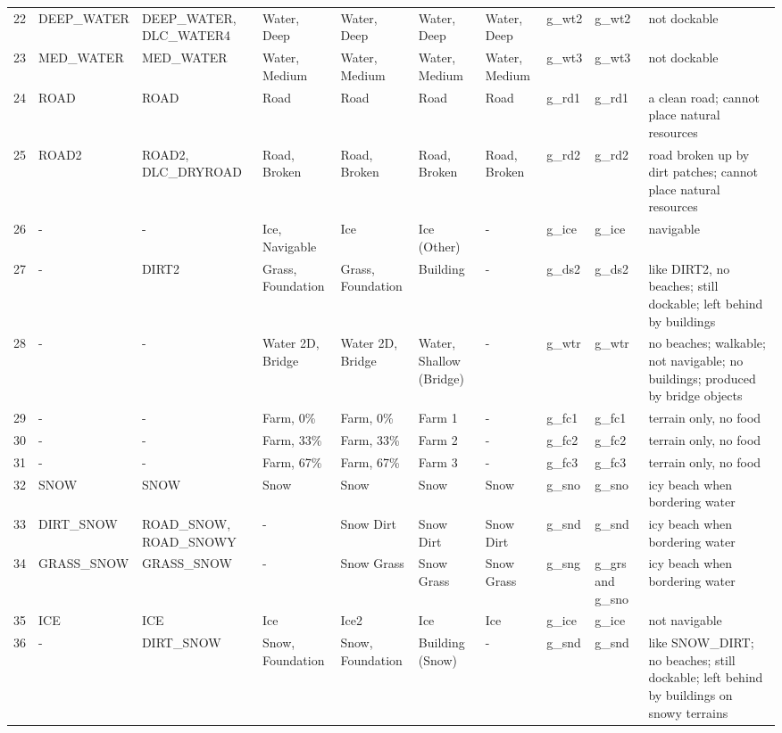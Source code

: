 \begin{landscape}
\begin{longtable}{@{}p{5mm}|p{25mm}p{23mm}|p{14mm}p{14mm}p{14mm}p{14mm}|p{10mm}p{15mm}|p{45mm}@{}}
            22	& DEEP\_WATER	& DEEP\_WATER, DLC\_WATER4	& Water, Deep	& Water, Deep	& Water, Deep	& Water, Deep	& g\_wt2	& g\_wt2		& not dockable \\
            23	& MED\_WATER	& MED\_WATER	& Water, Medium	& Water, Medium	& Water, Medium	& Water, Medium	& g\_wt3	& g\_wt3		& not dockable \\
            24	& ROAD	& ROAD	& Road	& Road	& Road	& Road	& g\_rd1	& g\_rd1		& a clean road; cannot place natural resources \\
            25	& ROAD2	& ROAD2, DLC\_DRYROAD	& Road, Broken	& Road, Broken	& Road, Broken	& Road, Broken	& g\_rd2	& g\_rd2		& road broken up by dirt patches; cannot place natural resources \\
            26	& -	& -	& Ice, Navigable	& Ice	& Ice (Other)	& -	& g\_ice	& g\_ice		& navigable \\
            27	& -	& DIRT2	& Grass, Foundation	& Grass, Foundation	& Building	& -	& g\_ds2	& g\_ds2		& like DIRT2, no beaches; still dockable; left behind by buildings \\
            28	& -	& -	& Water 2D, Bridge	& Water 2D, Bridge	& Water, Shallow (Bridge)	& -	& g\_wtr	& g\_wtr		& no beaches; walkable; not navigable; no buildings; produced by bridge objects \\
            29	& -	& -	& Farm, 0\%	& Farm, 0\%	& Farm 1	& -	& g\_fc1	& g\_fc1		& terrain only, no food \\
            30	& -	& -	& Farm, 33\%	& Farm, 33\%	& Farm 2	& -	& g\_fc2	& g\_fc2		& terrain only, no food \\
            31	& -	& -	& Farm, 67\%	& Farm, 67\%	& Farm 3	& -	& g\_fc3	& g\_fc3		& terrain only, no food \\
            32	& SNOW	& SNOW	& Snow	& Snow	& Snow	& Snow	& g\_sno	& g\_sno		& icy beach when bordering water \\
            33	& DIRT\_SNOW	& ROAD\_SNOW, ROAD\_SNOWY	& -	& Snow Dirt	& Snow Dirt	& Snow Dirt	& g\_snd	& g\_snd		& icy beach when bordering water \\
            34	& GRASS\_SNOW	& GRASS\_SNOW	& -	& Snow Grass	& Snow Grass	& Snow Grass	& g\_sng	& g\_grs and g\_sno		& icy beach when bordering water \\
            35	& ICE	& ICE	& Ice	& Ice2	& Ice	& Ice	& g\_ice	& g\_ice		& not navigable \\
            36	& -	& DIRT\_SNOW	& Snow, Foundation	& Snow, Foundation	& Building (Snow)	& -	& g\_snd	& g\_snd		& like SNOW\_DIRT; no beaches; still dockable; left behind by buildings on snowy terrains \\

\end{longtable}
\end{landscape}

